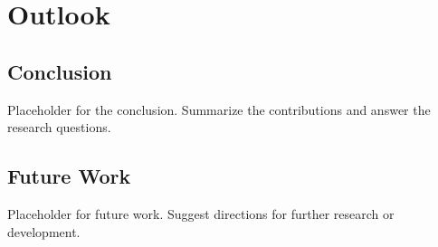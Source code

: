 \chapter{Outlook}

\section{Conclusion}
Placeholder for the conclusion. Summarize the contributions and answer the research questions.

\section{Future Work}
Placeholder for future work. Suggest directions for further research or development.
